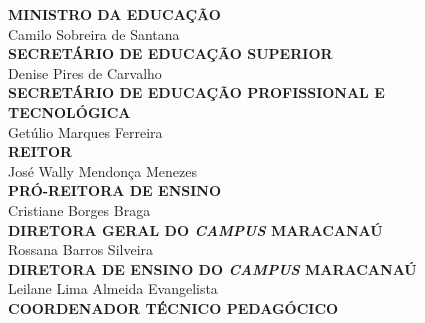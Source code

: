 \noindent\textbf{\MakeUppercase{Ministro da Educação}}\\
Camilo Sobreira de Santana\\

\noindent\textbf{\MakeUppercase{Secretário de Educação Superior}}\\
Denise Pires de Carvalho\\

\noindent\textbf{\MakeUppercase{SECRETÁRIO DE EDUCAÇÃO PROFISSIONAL E TECNOLÓGICA}}\\
Getúlio Marques Ferreira\\


\noindent\textbf{\MakeUppercase{Reitor}}\\
José Wally Mendonça Menezes\\

\noindent\textbf{\MakeUppercase{Pró-Reitora de Ensino}}\\
Cristiane Borges Braga\\

\noindent\textbf{\MakeUppercase{Diretora Geral do \textit{Campus} Maracanaú}}\\
\noindent Rossana Barros Silveira\\

\noindent\textbf{\MakeUppercase{Diretora de Ensino do \textit{Campus} Maracanaú}}\\
\noindent Leilane Lima Almeida Evangelista\\


\noindent\textbf{\MakeUppercase{Coordenador Técnico Pedagócico}}\\
\\
%
%
%
%





